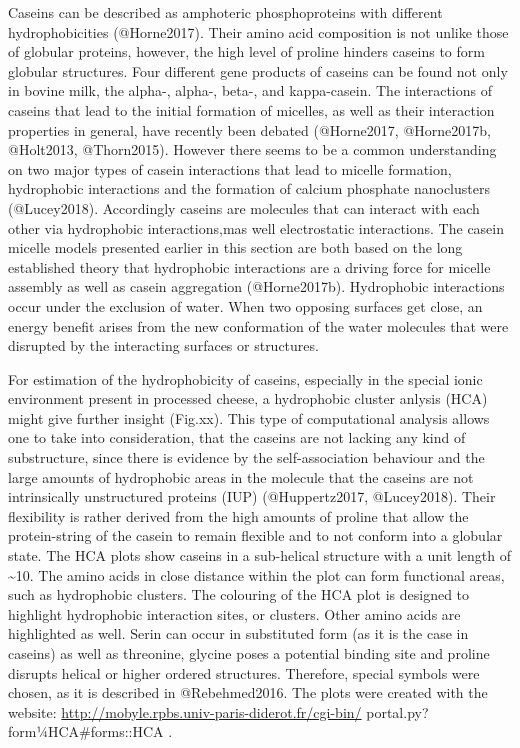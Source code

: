 \documentclass[
]{article}
\begin{document}
Caseins can be described as amphoteric phosphoproteins with different
hydrophobicities (@Horne2017). Their amino acid composition is not
unlike those of globular proteins, however, the high level of proline
hinders caseins to form globular structures. Four different gene
products of caseins can be found not only in bovine milk, the alpha-,
alpha-, beta-, and kappa-casein. The interactions of caseins that lead
to the initial formation of micelles, as well as their interaction
properties in general, have recently been debated (@Horne2017,
@Horne2017b, @Holt2013, @Thorn2015). However there seems to be a common
understanding on two major types of casein interactions that lead to
micelle formation, hydrophobic interactions and the formation of calcium
phosphate nanoclusters (@Lucey2018). Accordingly caseins are molecules
that can interact with each other via hydrophobic interactions,mas well
electrostatic interactions. The casein micelle models presented earlier
in this section are both based on the long established theory that
hydrophobic interactions are a driving force for micelle assembly as
well as casein aggregation (@Horne2017b). Hydrophobic interactions occur
under the exclusion of water. When two opposing surfaces get close, an
energy benefit arises from the new conformation of the water molecules
that were disrupted by the interacting surfaces or structures.

For estimation of the hydrophobicity of caseins, especially in the
special ionic environment present in processed cheese, a hydrophobic
cluster anlysis (HCA) might give further insight (Fig.xx). This type of
computational analysis allows one to take into consideration, that the
caseins are not lacking any kind of substructure, since there is
evidence by the self-association behaviour and the large amounts of
hydrophobic areas in the molecule that the caseins are not intrinsically
unstructured proteins (IUP) (@Huppertz2017, @Lucey2018). Their
flexibility is rather derived from the high amounts of proline that
allow the protein-string of the casein to remain flexible and to not
conform into a globular state. The HCA plots show caseins in a
sub-helical structure with a unit length of \textasciitilde10. The amino
acids in close distance within the plot can form functional areas, such
as hydrophobic clusters. The colouring of the HCA plot is designed to
highlight hydrophobic interaction sites, or clusters. Other amino acids
are highlighted as well. Serin can occur in substituted form (as it is
the case in caseins) as well as threonine, glycine poses a potential
binding site and proline disrupts helical or higher ordered structures.
Therefore, special symbols were chosen, as it is described in
@Rebehmed2016. The plots were created with the website:
\url{http://mobyle.rpbs.univ-paris-diderot.fr/cgi-bin/}
portal.py?form¼HCA\#forms::HCA .
\end{document}
